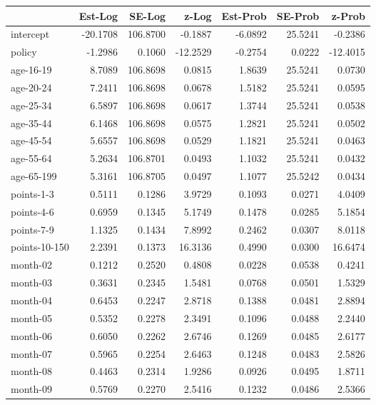 \documentclass[10pt]{article}
\begin{document}
\begin{table}[ht]
\centering
\begin{tabular}{lrrrrrr}
  \hline
 & Est-Log & SE-Log & z-Log & Est-Prob & SE-Prob & z-Prob \\ 
  \hline
intercept & -20.1708 & 106.8700 & -0.1887 & -6.0892 & 25.5241 & -0.2386 \\ 
  policy & -1.2986 & 0.1060 & -12.2529 & -0.2754 & 0.0222 & -12.4015 \\ 
  age-16-19 & 8.7089 & 106.8698 & 0.0815 & 1.8639 & 25.5241 & 0.0730 \\ 
  age-20-24 & 7.2411 & 106.8698 & 0.0678 & 1.5182 & 25.5241 & 0.0595 \\ 
  age-25-34 & 6.5897 & 106.8698 & 0.0617 & 1.3744 & 25.5241 & 0.0538 \\ 
  age-35-44 & 6.1468 & 106.8698 & 0.0575 & 1.2821 & 25.5241 & 0.0502 \\ 
  age-45-54 & 5.6557 & 106.8698 & 0.0529 & 1.1821 & 25.5241 & 0.0463 \\ 
  age-55-64 & 5.2634 & 106.8701 & 0.0493 & 1.1032 & 25.5241 & 0.0432 \\ 
  age-65-199 & 5.3161 & 106.8705 & 0.0497 & 1.1077 & 25.5242 & 0.0434 \\ 
  points-1-3 & 0.5111 & 0.1286 & 3.9729 & 0.1093 & 0.0271 & 4.0409 \\ 
  points-4-6 & 0.6959 & 0.1345 & 5.1749 & 0.1478 & 0.0285 & 5.1854 \\ 
  points-7-9 & 1.1325 & 0.1434 & 7.8992 & 0.2462 & 0.0307 & 8.0118 \\ 
  points-10-150 & 2.2391 & 0.1373 & 16.3136 & 0.4990 & 0.0300 & 16.6474 \\ 
  month-02 & 0.1212 & 0.2520 & 0.4808 & 0.0228 & 0.0538 & 0.4241 \\ 
  month-03 & 0.3631 & 0.2345 & 1.5481 & 0.0768 & 0.0501 & 1.5329 \\ 
  month-04 & 0.6453 & 0.2247 & 2.8718 & 0.1388 & 0.0481 & 2.8894 \\ 
  month-05 & 0.5352 & 0.2278 & 2.3491 & 0.1096 & 0.0488 & 2.2440 \\ 
  month-06 & 0.6050 & 0.2262 & 2.6746 & 0.1269 & 0.0485 & 2.6177 \\ 
  month-07 & 0.5965 & 0.2254 & 2.6463 & 0.1248 & 0.0483 & 2.5826 \\ 
  month-08 & 0.4463 & 0.2314 & 1.9286 & 0.0926 & 0.0495 & 1.8711 \\ 
  month-09 & 0.5769 & 0.2270 & 2.5416 & 0.1232 & 0.0486 & 2.5366 \\ 

\end{tabular}
\end{table}
\end{document}
